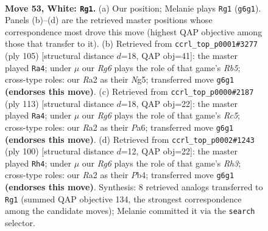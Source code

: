 \documentclass[11pt]{article}
\begin{document}
\clearpage

\begin{figure}[p]\centering
\begin{subfigure}{0.46\textwidth}\centering
\resizebox{\linewidth}{!}{%
\newchessgame
\chessboard[
  setfen={6k1/1r4b1/6R1/8/2P4K/4N3/R7/8 w - - 26 53},
  showmover=false,
  pgfstyle=straightmove, color=movearrow, markmove={g6-g1}
]}
\caption{}
\end{subfigure}\hfill
\begin{subfigure}{0.46\textwidth}\centering
\resizebox{\linewidth}{!}{%
\newchessgame
\chessboard[
  setfen={8/4k3/8/6n1/1rB4R/6P1/4K3/8 b - - 4 53},
  showmover=false,
  pgfstyle=straightmove, color=movearrow, markmove={b4-a4}
]}
\caption{}
\end{subfigure}
\\[4pt]
\begin{subfigure}{0.46\textwidth}\centering
\resizebox{\linewidth}{!}{%
\newchessgame
\chessboard[
  setfen={4k3/R7/p7/8/2r1BK2/8/8/8 b - - 8 57},
  showmover=false,
  pgfstyle=straightmove, color=movearrow, markmove={c4-a4}
]}
\caption{}
\end{subfigure}\hfill
\begin{subfigure}{0.46\textwidth}\centering
\resizebox{\linewidth}{!}{%
\newchessgame
\chessboard[
  setfen={8/8/6k1/8/1P6/4rb1R/8/2K5 w - - 0 51},
  showmover=false,
  pgfstyle=straightmove, color=movearrow, markmove={h3-h4}
]}
\caption{}
\end{subfigure}
\caption{\textbf{Move 53, White: \texttt{Rg1}.} (a) Our position; Melanie plays \texttt{Rg1} (\texttt{g6g1}). Panels (b)--(d) are the retrieved master positions whose correspondence most drove this move (highest QAP objective among those that transfer to it). (b) Retrieved from \texttt{ccrl\_top\_p0001\#3277} (ply 105) [structural distance $d$=18, QAP obj=41]: the master played \texttt{Ra4}; under $\mu$ our \emph{Rg6} plays the role of that game's \emph{Rb5}; cross-type roles: our \emph{R}a2 as their \emph{N}g5; transferred move \texttt{g6g1} \textbf{(endorses this move)}. (c) Retrieved from \texttt{ccrl\_top\_p0000\#2187} (ply 113) [structural distance $d$=18, QAP obj=22]: the master played \texttt{Ra4}; under $\mu$ our \emph{Rg6} plays the role of that game's \emph{Rc5}; cross-type roles: our \emph{R}a2 as their \emph{P}a6; transferred move \texttt{g6g1} \textbf{(endorses this move)}. (d) Retrieved from \texttt{ccrl\_top\_p0002\#1243} (ply 100) [structural distance $d$=12, QAP obj=22]: the master played \texttt{Rh4}; under $\mu$ our \emph{Rg6} plays the role of that game's \emph{Rh3}; cross-type roles: our \emph{R}a2 as their \emph{P}b4; transferred move \texttt{g6g1} \textbf{(endorses this move)}. Synthesis: 8 retrieved analogs transferred to \texttt{Rg1} (summed QAP objective 134, the strongest correspondence among the candidate moves); Melanie committed it via the \texttt{search} selector.}
\label{fig:thought-m104}
\end{figure}
\end{document}
